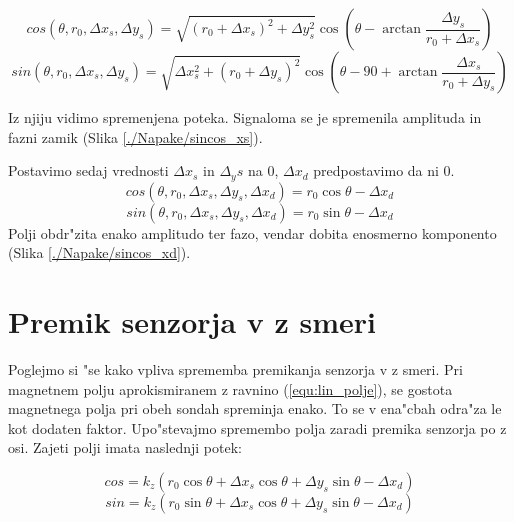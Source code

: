 \begin{equation}
\label{equ:Bx_stat}
cos(\theta,r_0,\Delta x_s, \Delta y_s)= \sqrt{(r_0+\Delta x_s)^2+\Delta y_s^2}\cos(\theta -\arctan \frac{\Delta y_s}{r_0+\Delta x_s})
\end{equation}
\begin{equation}\label{equ:By_stat}
sin(\theta,r_0,\Delta x_s, \Delta y_s)= \sqrt{\Delta x_s^2+(r_0+\Delta y_s)^2} \cos(\theta - 90 +\arctan \frac{\Delta x_s}{r_0+\Delta y_s})
\end{equation}

Iz njiju vidimo spremenjena poteka. Signaloma se je spremenila amplituda in fazni zamik (Slika \ref{./Napake/sincos_xs}).

\newpage
Postavimo sedaj vrednosti $\Delta x_s$ in $\Delta_ys$ na 0, $\Delta x_d$ predpostavimo da ni 0.
\begin{equation}
\label{equ:Bx_din}
cos(\theta,r_0,\Delta x_s, \Delta y_s, \Delta x_d)= r_0 \cos\theta-\Delta x_d
\end{equation}
\begin{equation}
\label{equ:By_din}
sin(\theta,r_0,\Delta x_s, \Delta y_s, \Delta x_d)= r_0 \sin\theta-\Delta x_d
\end{equation}
Polji obdr"zita enako amplitudo ter fazo, vendar dobita enosmerno komponento (Slika \ref{./Napake/sincos_xd}).
\newpage
\section{Premik senzorja v z smeri}

Poglejmo si "se kako vpliva sprememba premikanja senzorja v z smeri.
Pri magnetnem polju aprokismiranem z ravnino (\ref{equ:lin_polje}), se gostota magnetnega polja pri obeh sondah spreminja enako. To se v ena"cbah odra"za le kot dodaten faktor. Upo"stevajmo spremembo polja zaradi premika senzorja po z osi. Zajeti polji imata naslednji potek:


\begin{equation}\label{equ:Bx_z}
cos=k_z( r_0 \cos\theta +\Delta x_s \cos\theta +\Delta y_s \sin\theta -\Delta x_d)
\end{equation}
\begin{equation}\label{equ:By_z}
sin=k_z( r_0 \sin\theta +\Delta x_s \cos\theta +\Delta y_s \sin\theta-\Delta x_d)
\end{equation}

